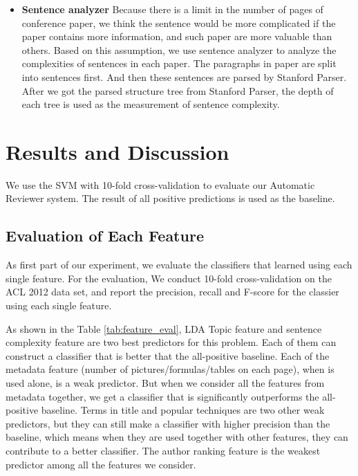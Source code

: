 \documentclass[11pt,letterpaper]{article}
\begin{document}
\begin{itemize}
\item	{\bf Sentence analyzer}
Because there is a limit in the number of pages of conference paper, we think the sentence would be more complicated if the paper contains more information, and such paper are more valuable than others. Based on this assumption, we use sentence analyzer to analyze the complexities of sentences in each paper. The paragraphs in paper are split into sentences first. And then these sentences are parsed by Stanford Parser. After we got the parsed structure tree from Stanford Parser, the depth of each tree is used as the measurement of sentence complexity. 

\end{itemize} 









\section{Results and Discussion}
We use the SVM with 10-fold cross-validation to evaluate our Automatic Reviewer system. The result of all positive predictions is used as the baseline. 


\subsection{Evaluation of Each Feature}
\label{sec:feature_eval}
As first part of our experiment, 
we evaluate the classifiers that learned using each single feature.
For the evaluation,
We conduct 10-fold cross-validation on the ACL 2012 data set,
and report the precision, recall and F-score for the classier using each single feature.

As shown in the Table \ref{tab:feature_eval},
LDA Topic feature and sentence complexity feature are two best predictors for this problem.
Each of them can construct a classifier that is better that the all-positive baseline.
Each of the metadata feature (number of pictures/formulas/tables on each page),
when is used alone, is a weak predictor.
But when we consider all the features from metadata together,
we get a classifier that is significantly outperforms the all-positive baseline.
Terms in title and popular techniques are two other weak predictors,
but they can still make a classifier with higher precision than the baseline,
which means when they are used together with other features, they can contribute to a better classifier.
The author ranking feature is the weakest predictor among all the features we consider.
\end{document}
